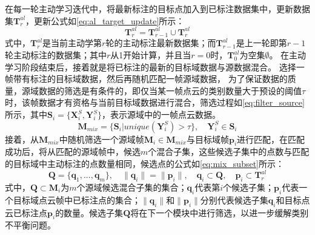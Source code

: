     在每一轮主动学习迭代中，将最新标注的目标点加入到已标注数据集中，更新数据集$\mathbf{T}^{al}_r$，更新公式如\eqref{eq:al_target_update}所示：
    \begin{equation}
        \label{eq:al_target_update}
        \mathbf{T}^{al}_r = \mathbf{T}^{al}_{r-1} \cup \mathbf{T}^{al}_r 
    \end{equation}
    式中，$\mathbf{T}^{al}_r$是当前主动学第$r$轮的主动标注最新数据集；而$\mathbf{T}^{al}_{r-1}$是上一轮即第$r-1$轮主动标注的数据集；其中$r$从1开始计算，并且当$r=0$时，$\mathbf{T}^{al}_0$为空集$\emptyset$。
    在主动学习阶段结束后，接着就是将已标注的最新的目标域数据与源数据混合。
    选择一帧带有标注的目标域数据，然后再随机匹配一帧源域数据，
    为了保证数据的质量，源域数据的筛选是有条件的，即仅当某一帧点云的类别数量大于预设的阈值$\tau$时，该帧数据才有资格与当前目标域数据进行混合，筛选过程如\eqref{eq:filter_source}所示，其中$\mathbf{S}_i = \{\mathbf{X}^S_i,\mathbf{Y}^S_i\}$，表示源域中的一帧点云数据。
    \begin{equation}
        \label{eq:filter_source}
        \mathbf{M}_{mix}= \{\mathbf{S}_i | unique(\mathbf{Y}^S_i)> \tau\}, \quad \mathbf{Y}^S_i \in \mathbf{S}_i
    \end{equation}
    接着，从$\mathbf{M}_{mix}$中随机筛选一个源域帧$\mathbf{M}_i \in \mathbf{M}_{mix}$与目标域帧$\mathbf{p}_i$进行匹配，在匹配成功后，将从匹配的源域帧中，候选$m$个混合子集，这些候选子集中的点数与匹配的目标域中主动标注的点数量相同，候选点的公式如\eqref{eq:mix_subset}所示：
    \begin{equation}
        \label{eq:mix_subset}
        \mathbf{Q} = \{\mathbf{q}_1,...,\mathbf{q}_m\}, 
        \quad
        \|\mathbf{q}_i\| = \|\mathbf{p}_i\|,
        \quad
        \mathbf{q}_i \subset \mathbf{Q},
        \quad
        \mathbf{p}_i \subset \mathbf{T}^{al}_r
    \end{equation}
    式中，$\mathbf{Q} \subset \mathbf{M}_i$为$m$个源域候选混合子集的集合；$\mathbf{q}_i$代表第$i$个候选子集；$\mathbf{p}_i$代表一个目标域点云帧中已标注点的集合；$\|\mathbf{q}_i\|$和$\|\mathbf{p}_i\|$分别代表候选子集$\mathbf{q}_i$和目标点云已标注点$\mathbf{p}_i$的数量。候选子集$\mathbf{Q}$将在下一个模块中进行筛选，以进一步缓解类别不平衡问题。

